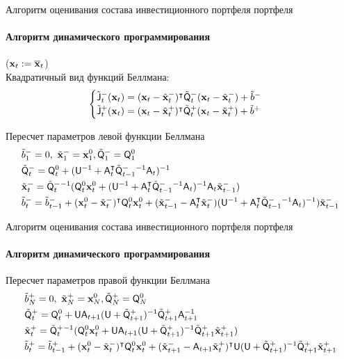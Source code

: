 \documentclass[1pt]{beamer}
\let\T\intercal
\let\ov\overline
\def\bar_#1{\bold{\ov{#1}}}
\def\msf_#1{\mathsf{#1}}
\def\bo_#1{\bold{#1}}
\begin{document}
\begin{frame}{Алгоритм оценивания состава инвестиционного портфеля портфеля}
\framesubtitle{Алгоритм динамического программирования}
($\bo_x_t := \bar_x_t$)\\ Квадратичный вид функций Беллмана: \[\begin{cases}\tilde{\msf_J}_t^{-}(\bo_x_t) = (\bo_x_t - \tilde{\bo_x}_t^{-})^\T\tilde{\msf_Q}_t^{-}(\bo_x_t - \tilde{\bo_x}_t^{-}) + \tilde{b}^{-}\\ \tilde{\msf_J}_t^{+}(\bo_x_t) = (\bo_x_t - \tilde{\bo_x}_t^{+})^\T\tilde{\msf_Q}_t^{+}(\bo_x_t - \tilde{\bo_x}_t^{+}) + \tilde{b}^{+}\end{cases}\]
\begin{block}{Пересчет параметров левой функции Беллмана}
\begin{align*}
&\tilde{b}_1^{-}=0,\ \tilde{\bo_x}_1^{-} = \bo_x_1^0, \tilde{\msf_Q}_1^{-} = \msf_Q_1^0\\
&\tilde{\msf_Q}_t^{-} =\msf_Q_t^0 + (\msf_U^{-1}+\msf_A_t^\T\tilde{\msf_Q}_{t-1}^{-}{}^{-1}\msf_A_t)^{-1} \\
&\tilde{\bo_x}_t^{-} = \tilde{\msf_Q}_t^{-}{}^{-1}(\msf_Q_t^0\bo_x_t^0 + (\msf_U^{-1}+\msf_A_t^\T\tilde{\msf_Q}_{t-1}^{-}{}^{-1}\msf_A_t)^{-1}\msf_A_t\tilde{\bo_x}_{t-1}^{-})\\
&\tilde{b}_t^{-} = \tilde{b}_{t-1}^{-} + (\bo_x_t^0 - \tilde{\bo_x}_t^{-})^\T\msf_Q_t^0\bo_x_t^0 + (\tilde{\bo_x}_{t-1}^{-} - \msf_A_t^\T\tilde{\bo_x}_t^{-})(\msf_U^{-1}+\msf_A_t^\T\tilde{\msf_Q}_{t-1}^{-}{}^{-1}\msf_A_t)^{-1})\tilde{\bo_x}_{t-1}^{-} \\
\end{align*}
\end{block}
\end{frame}


\begin{frame}{Алгоритм оценивания состава инвестиционного портфеля портфеля}
\framesubtitle{Алгоритм динамического программирования}
\begin{block}{Пересчет параметров правой функции Беллмана}
\begin{align*}
&\tilde{b}_N^{+}=0,\ \tilde{\bo_x}_N^{+} = \bo_x_N^0, \tilde{\msf_Q}_N^{+} = \msf_Q_N^0\\
&\tilde{\msf_Q}_t^{+} =\msf_Q_t^0 + \msf_U\msf_A_{t+1}(\msf_U+\tilde{\msf_Q}_{t+1}^{+})^{-1}\tilde{\msf_Q}_{t+1}^{+}\msf_A_{t+1}^{-1}\\
&\tilde{\bo_x}_t^{+} = \tilde{\msf_Q}_t^{+}{}^{-1}(\msf_Q_t^0\bo_x_t^0 + \msf_U\msf_A_{t+1}(\msf_U+\tilde{\msf_Q}_{t+1}^{+})^{-1}\tilde{\msf_Q}_{t+1}^{+}\tilde{\bo_x}_{t+1}^{+})\\
&\tilde{b}_t^{+} = \tilde{b}_{t-1}^{+} + (\bo_x_t^0 - \tilde{\bo_x}_t^{-})^\T\msf_Q_t^0\bo_x_t^0 + (\tilde{\bo_x}_{t+1}^{-} - \msf_A_{t+1}\tilde{\bo_x}_t^{+})^\T\msf_U(\msf_U+
\tilde{\msf_Q}_{t+1}^{+})^{-1}\tilde{\msf_Q}_{t+1}^{+}\tilde{\bo_x}_{t+1}^{+}\\
\end{align*}
\end{block}
\end{frame}

\begin{frame}
\end{frame}

\end{document}
